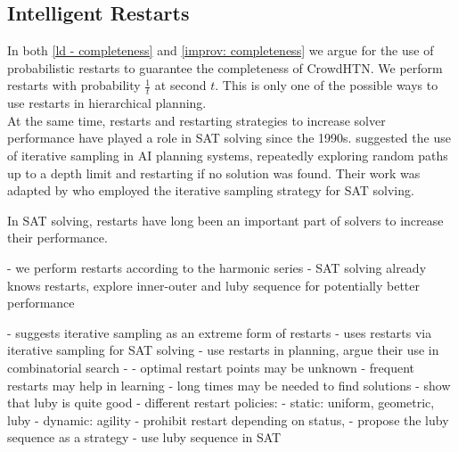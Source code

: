 \subsection{Intelligent Restarts}
In both \ref{ld - completeness} and \ref{improv: completeness} we argue for the use of probabilistic restarts to guarantee the completeness of CrowdHTN. We perform restarts with probability $\frac{1}{t}$ at second $t$. This is only one of the possible ways to use restarts in hierarchical planning. \\
At the same time, restarts and restarting strategies to increase solver performance have played a role in SAT solving since the 1990s.
\cite{langley1992systematic} suggested the use of iterative sampling in AI planning systems, repeatedly exploring random paths up to a depth limit and restarting if no solution was found. Their work was adapted by \cite{crawford1994experimental} who employed the iterative sampling strategy for SAT solving.

In SAT solving, restarts have long been an important part of solvers to increase their performance.

- we perform restarts according to the harmonic series
- SAT solving already knows restarts, explore inner-outer and luby sequence for potentially better performance

- \cite{langley1992systematic} suggests iterative sampling as an extreme form of restarts
- \cite{crawford1994experimental} uses restarts via iterative sampling for SAT solving
- \cite{gomes1998boosting} use restarts in planning, argue their use in combinatorial search
- \cite{biere2015evaluating}
	- optimal restart points may be unknown
	- frequent restarts may help in learning
	- long times may be needed to find solutions
	- show that luby is quite good
	- different restart policies:
		- static: uniform, geometric, luby
		- dynamic: agility - prohibit restart depending on status, 
- \cite{luby1993optimal} propose the luby sequence as a strategy
- \cite{huang2007effect} use luby sequence in SAT
